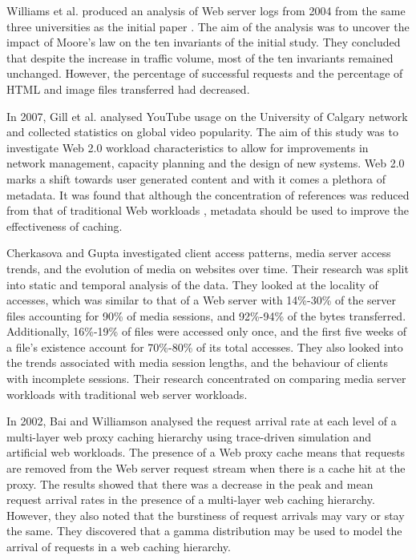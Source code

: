 \documentclass[10pt,conference]{IEEEtran}
\begin{document}
Williams et al. \cite{williams05} produced an analysis of Web server logs from 2004 from the same three universities as the initial paper \cite{keynote}. The aim of the analysis was to uncover the impact of Moore's law on the ten invariants of the initial study. They concluded that despite the increase in traffic volume, most of the ten invariants remained unchanged. However, the percentage of successful requests and the percentage of HTML and image files transferred had decreased. 

In 2007, Gill et al. \cite{youtube} analysed YouTube usage on the University of Calgary network and collected statistics on global video popularity. The aim of this study was to investigate Web 2.0 workload characteristics to allow for improvements in network management, capacity planning and the design of new systems. Web 2.0 marks a shift towards user generated content and with it comes a plethora of metadata. It was found that although the concentration of references was reduced from that of traditional Web workloads \cite{keynote}, metadata should be used to improve the effectiveness of caching.

Cherkasova and Gupta \cite{Cherkasova} investigated client access patterns, media server access trends, and the evolution of media on websites over time. Their research was split into static and temporal analysis of the data. They looked at the locality of accesses, which was similar to that of a Web server with 14\%-30\% of the server files accounting for 90\% of media sessions, and 92\%-94\% of the bytes transferred. Additionally, 16\%-19\% of files were accessed only once, and the first five weeks of a file’s existence account for 70\%-80\% of its total accesses. They also looked into the trends associated with media session lengths, and the behaviour of clients with incomplete sessions. Their research concentrated on comparing media server workloads with traditional web server workloads.

In 2002, Bai and Williamson \cite{Bai} analysed the request arrival rate at each level of a multi-layer web proxy caching hierarchy using trace-driven simulation and artificial web workloads. The presence of a Web proxy cache means that requests are removed from the Web server request stream when there is a cache hit at the proxy. The results showed that there was a decrease in the peak and mean request arrival rates in the presence of a multi-layer web caching hierarchy. However, they also noted that the burstiness of request arrivals may vary or stay the same. They discovered that a gamma distribution may be used to model the arrival of requests in a web caching hierarchy.
\end{document}
